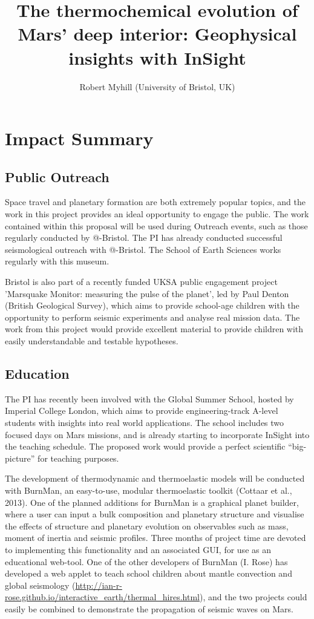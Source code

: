 \documentclass[11pt,twoside,a4paper]{article}
\date{}
\title{The thermochemical evolution of Mars' deep interior: Geophysical insights with InSight}
\author{Robert Myhill (University of Bristol, UK)}
\begin{document}
\section*{Impact Summary}


\subsection*{Public Outreach}

Space travel and planetary formation are both extremely popular topics, and the work in this project provides an ideal opportunity to engage the public. The work contained within this proposal will be used during Outreach events, such as those regularly conducted by @-Bristol. The PI has already conducted successful seismological outreach with @-Bristol. The School of Earth Sciences works regularly with this museum.

Bristol is also part of a recently funded UKSA public engagement project 'Marsquake Monitor: measuring the pulse of the planet', led by Paul Denton (British Geological Survey), which aims to provide school-age children with the opportunity to perform seismic experiments and analyse real mission data. The work from this project would provide excellent material to provide children with easily understandable and testable hypotheses.

\subsection*{Education}
The PI has recently been involved with the Global Summer School, hosted by Imperial College London, which aims to provide engineering-track A-level students with insights into real world applications. The school includes two focused days on Mars missions, and is already starting to incorporate InSight into the teaching schedule. The proposed work would provide a perfect scientific “big-picture” for teaching purposes.

The development of thermodynamic and thermoelastic models will be conducted with BurnMan, an easy-to-use, modular thermoelastic toolkit (Cottaar et al., 2013). One of the planned additions for BurnMan is a graphical planet builder, where a user can input a bulk composition and planetary structure and visualise the effects of structure and planetary evolution on observables such as mass, moment of inertia and seismic profiles. Three months of project time are devoted to implementing this functionality and an associated GUI, for use as an educational web-tool. One of the other developers of BurnMan (I. Rose) has developed a web applet to teach school children about mantle convection and global seismology (\url{http://ian-r-rose.github.io/interactive_earth/thermal_hires.html}), and the two projects could easily be combined to demonstrate the propagation of seismic waves on Mars.
\end{document}
